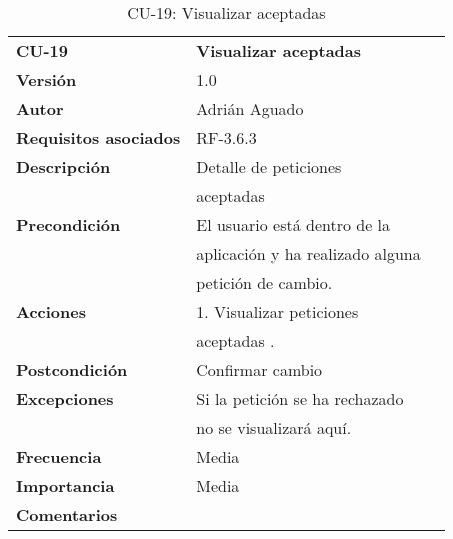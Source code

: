 \begin{table}[H]
\begin{tabular}{llr}  
\toprule
\begin{minipage}[b]{0.24\columnwidth}\raggedright\strut
\textbf{CU-19}\strut
\end{minipage} & \begin{minipage}[b]{0.72\columnwidth}\raggedright\strut
\textbf{Visualizar aceptadas}\strut
\end{minipage}\tabularnewline
\cmidrule(r){1-2}
\textbf{Versión}       & 1.0           \\
\textbf{Autor}       & Adrián  Aguado    \\
\textbf{Requisitos asociados}       & RF-3.6.3  \\
\textbf{Descripción} & Detalle de peticiones \\
& aceptadas\\
\textbf{Precondición}  & El usuario está dentro de la \\
& aplicación y ha realizado alguna  \\
& petición de cambio.  \\
\textbf{Acciones} & 1. Visualizar peticiones\\
& aceptadas . \\
\textbf{Postcondición} &  Confirmar cambio \\
\textbf{Excepciones} &  Si la petición se ha rechazado   \\
&  no se visualizará aquí.   \\
\textbf{Frecuencia} & Media          \\
\textbf{Importancia} & Media           \\
\textbf{Comentarios } &   \\
\bottomrule
\end{tabular}
\caption{CU-19: Visualizar aceptadas} 
\end{table}

